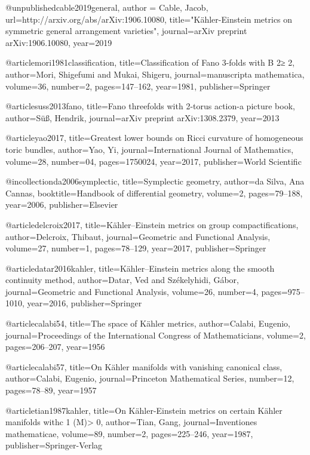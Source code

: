 @unpublished{cable2019general,
   author = {Cable, Jacob},
   url={http://arxiv.org/abs/arXiv:1906.10080},
   title="{K{\"a}hler-{E}instein metrics on symmetric general arrangement varieties}",
   journal={arXiv preprint arXiv:1906.10080},
   year={2019}
}

@article{mori1981classification,
  title={Classification of Fano 3-folds with B 2≥ 2},
  author={Mori, Shigefumi and Mukai, Shigeru},
  journal={manuscripta mathematica},
  volume={36},
  number={2},
  pages={147--162},
  year={1981},
  publisher={Springer}
}

@article{suss2013fano,
  title={Fano threefolds with 2-torus action-a picture book},
  author={S{\"u}{\ss}, Hendrik},
  journal={arXiv preprint arXiv:1308.2379},
  year={2013}
}

@article{yao2017,
  title={Greatest lower bounds on Ricci curvature of homogeneous toric bundles},
  author={Yao, Yi},
  journal={International Journal of Mathematics},
  volume={28},
  number={04},
  pages={1750024},
  year={2017},
  publisher={World Scientific}
}

@incollection{da2006symplectic,
  title={Symplectic geometry},
  author={da Silva, Ana Cannas},
  booktitle={Handbook of differential geometry},
  volume={2},
  pages={79--188},
  year={2006},
  publisher={Elsevier}
}


@article{delcroix2017,
  title={K{\"a}hler--Einstein metrics on group compactifications},
  author={Delcroix, Thibaut},
  journal={Geometric and Functional Analysis},
  volume={27},
  number={1},
  pages={78--129},
  year={2017},
  publisher={Springer}
}


@article{datar2016kahler,
  title={K{\"a}hler--Einstein metrics along the smooth continuity method},
  author={Datar, Ved and Sz{\'e}kelyhidi, G{\'a}bor},
  journal={Geometric and Functional Analysis},
  volume={26},
  number={4},
  pages={975--1010},
  year={2016},
  publisher={Springer}
}


@article{calabi54,
  title={The space of {K}{\"a}hler metrics},
  author={Calabi, Eugenio},
  journal={Proceedings of the International Congress of Mathematicians},
  volume={2},
  pages={206--207},
  year={1956}
}

@article{calabi57,
  title={On {K}{\"a}hler manifolds with vanishing canonical class},
  author={Calabi, Eugenio},
  journal={Princeton Mathematical Series},
  number={12},
  pages={78--89},
  year={1957}
}


@article{tian1987kahler,
  title={On K{\"a}hler-Einstein metrics on certain K{\"a}hler manifolds withc 1 (M)> 0},
  author={Tian, Gang},
  journal={Inventiones mathematicae},
  volume={89},
  number={2},
  pages={225--246},
  year={1987},
  publisher={Springer-Verlag}
}


